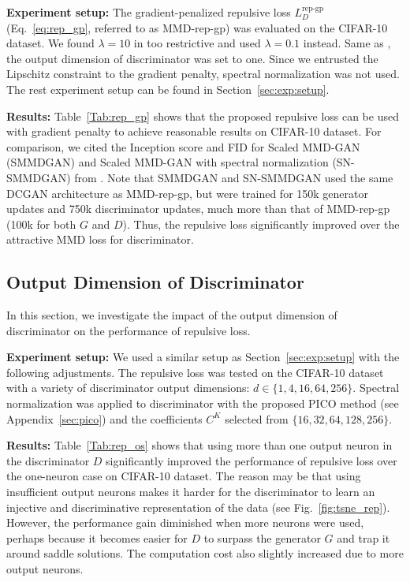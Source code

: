 \documentclass{article} %
\theoremstyle{plain}
\newtheorem*{proposition 1*}{Proposition 1}
\begin{document}
\begin{appendices}
\textbf{Experiment setup:} The gradient-penalized repulsive loss \(L_{D}^{\text{rep-gp}}\) (Eq.~\ref{eq:rep_gp}, referred to as MMD-rep-gp) was evaluated on the CIFAR-10 dataset. We found \(\lambda=10\) in \cite{mmd_gp} too restrictive and used \(\lambda=0.1\) instead. Same as \cite{mmd_gp}, the output dimension of discriminator was set to one. Since we entrusted the Lipschitz constraint to the gradient penalty, spectral normalization was not used. The rest experiment setup can be found in Section~\ref{sec:exp:setup}.

\textbf{Results:} Table~\ref{Tab:rep_gp} shows that the proposed repulsive loss can be used with gradient penalty to achieve reasonable results on CIFAR-10 dataset. For comparison, we cited the Inception score and FID for Scaled MMD-GAN (SMMDGAN) and Scaled MMD-GAN with spectral normalization (SN-SMMDGAN) from \cite{mmd_gp}. Note that SMMDGAN and SN-SMMDGAN used the same DCGAN architecture as MMD-rep-gp, but were trained for 150k generator updates and 750k discriminator updates, much more than that of MMD-rep-gp (100k for both \(G\) and \(D\)). Thus, the repulsive loss significantly improved over the attractive MMD loss for discriminator. 

\subsection{Output Dimension of Discriminator}
\label{sec:exp:D_out}
In this section, we investigate the impact of the output dimension of discriminator on the performance of repulsive loss. 

\textbf{Experiment setup:} We used a similar setup as Section~\ref{sec:exp:setup} with the following adjustments. The repulsive loss was tested on the CIFAR-10 dataset with a variety of discriminator output dimensions: \(d\in\{1, 4, 16, 64, 256\}\). Spectral normalization was applied to discriminator with the proposed PICO method (see Appendix~\ref{sec:pico}) and the coefficients \(C^K\) selected from \(\{16, 32, 64, 128, 256\}\).

\textbf{Results:} Table~\ref{Tab:rep_os} shows that using more than one output neuron in the discriminator \(D\) significantly improved the performance of repulsive loss over the one-neuron case on CIFAR-10 dataset. The reason may be that using insufficient output neurons makes it harder for the discriminator to learn an injective and discriminative representation of the data (see Fig.~\ref{fig:tsne_rep}). However, the performance gain diminished when more neurons were used, perhaps because it becomes easier for \(D\) to surpass the generator \(G\) and trap it around saddle solutions. The computation cost also slightly increased due to more output neurons.


\end{appendices}
\end{document}
